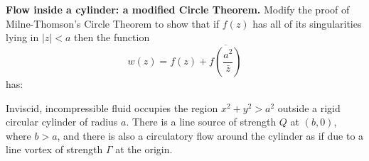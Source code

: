 \documentclass[answers]{exam}
\begin{document}
\begin{questions}



\question%
\textbf{Flow inside a cylinder: a modified Circle Theorem.} Modify the proof of Milne-Thomson's Circle Theorem to show that if $f(z)$ has all of its singularities lying in $|z|<a$ then the function \[
	w(z)=f(z)+\overline{f\left(\frac{a^{2}}{\bar{z}}\right)}
\] has:



\question%
Inviscid, incompressible fluid occupies the region $x^{2}+y^{2}>a^{2}$ outside a rigid circular cylinder of radius $a$. There is a line source of strength $Q$ at $(b, 0)$, where $b>a$, and there is also a circulatory flow around the cylinder as if due to a line vortex of strength $\Gamma$ at the origin.
\end{questions}
\end{document}
